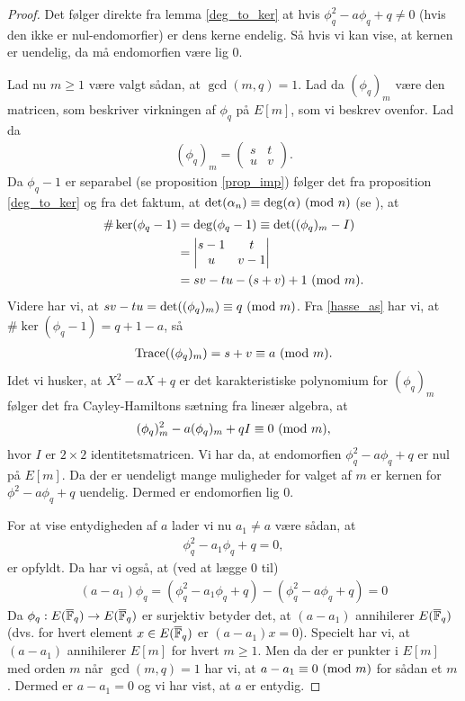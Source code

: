 \begin{proof}
Det følger direkte fra lemma \ref{deg_to_ker} at hvis $\phi_{q}^{2} -a \phi_q + q \neq 0$ (hvis den ikke er nul-endomorfier) er dens kerne endelig. Så hvis vi kan vise, at kernen er uendelig, da må endomorfien være lig $0$.

Lad nu $m \geq 1$ være valgt sådan, at $\gcd(m, q) = 1$. Lad da $(\phi_q)_m$ være den matricen, som beskriver virkningen af $\phi_q$ på $E[m]$, som vi beskrev ovenfor. Lad da
\begin{align*}
	(\phi_q)_m = \left( 
	\begin{matrix}
		s & t \\
		u & v
	\end{matrix} \right).
\end{align*}
Da $\phi_q - 1$ er separabel (se proposition \ref{prop_imp}) følger det fra proposition \ref{deg_to_ker} og fra det faktum, at $\det(\alpha_n) \equiv \deg(\alpha) \ (\mathrm{mod} \ n)$ (se \cite[proposition~3.15]{Washington}), at
\begin{align*}
	\# \ker (\phi_q - 1) &= \deg(\phi_q - 1) \equiv \det((\phi_q)_m - I) \\ 
	&= 
	\left| \begin{matrix}
		s-1 & t \\
		u & v - 1 
	\end{matrix} \right| \\
	&= sv - tu - (s + v) + 1 \ (\mathrm{mod} \ m).
\end{align*}
Videre har vi, at $sv-tu = \det((\phi_q)_m) \equiv q \ (\mathrm{mod} \ m)$. Fra \eqref{hasse_as} har vi, at 
$\# \ker(\phi_q - 1) = q + 1 - a$, så
\begin{align*}
	\text{Trace}((\phi_q)_m) = s + v \equiv a \ (\mathrm{mod} \ m).
\end{align*}
Idet vi husker, at $X^2 - aX + q$ er det karakteristiske polynomium for $(\phi_q)_m$ følger det fra
Cayley-Hamiltons sætning fra lineær algebra, at
\begin{align*}
	(\phi_q)_{m}^{2} - a(\phi_q)_m + qI \equiv 0 \ (\mathrm{mod} \ m),
\end{align*}
hvor $I$ er $2 \times 2$ identitetsmatricen. Vi har da, at endomorfien $\phi_{q}^{2} -a\phi_q + q$ er nul på $E[m]$. Da der er uendeligt mange muligheder for valget af $m$ er kernen for ${\phi}^2 - a\phi_q + q$ uendelig. Dermed er endomorfien lig $0$.

For at vise entydigheden af $a$ lader vi nu $a_1 \neq a$ være sådan, at 
\begin{align*}
	\phi_{q}^{2} - a_1 \phi_q + q = 0,
\end{align*}
er opfyldt. Da har vi også, at (ved at lægge $0$ til)
\begin{align*}
	(a - a_1) \phi_q = (\phi_{q}^{2} - a_1 \phi_q + q) - (\phi_{q}^{2} - a\phi_q + q) = 0
\end{align*}
Da $\phi_q : E(\overline{\mathbb{F}}_q) \to E(\overline{\mathbb{F}}_q)$ er surjektiv betyder det, at $(a - a_1)$ annihilerer $E(\overline{\mathbb{F}}_q)$ (dvs. for hvert element $x \in E(\overline{\mathbb{F}}_q)$ er $(a-a_1)x = 0$). Specielt har vi, at $(a - a_1)$ annihilerer $E[m]$ for hvert $m \geq 1$. Men da der er punkter i $E[m]$ med orden $m$ når $\gcd(m, q) =1$ har vi, at $a - a_1 \equiv 0 \ (\mathrm{mod} \ m)$ for sådan et $m$. Dermed er $a - a_ 1 = 0$ og vi har vist, at $a$ er entydig.
\end{proof}

